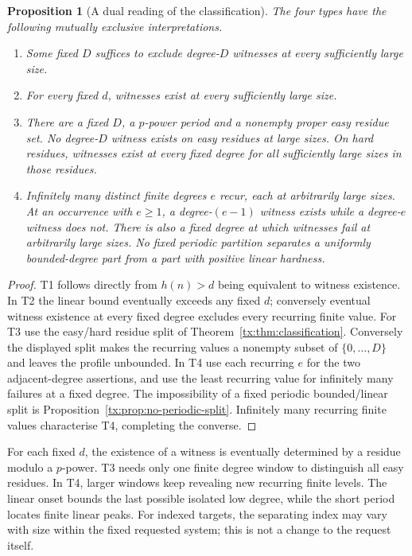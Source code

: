 \documentclass[11pt,a4paper,oneside,openany]{book}
\newtheorem{proposition}[theorem]{Proposition}
\theoremstyle{definition}\newtheorem{definition}[theorem]{Definition}
\theoremstyle{remark}\newtheorem{remark}[theorem]{Remark}
\numberwithin{equation}{chapter}
\begin{document}
\begin{proposition}[A dual reading of the classification]
\label{tx:prop:semantic-types}
The four types have the following mutually exclusive interpretations.
\begin{enumerate}[label=\textup{T\arabic*.}]
\item Some fixed $D$ suffices to exclude degree-$D$ witnesses at every
      sufficiently large size.
\item For every fixed $d$, witnesses exist at every sufficiently large
      size.
\item There are a fixed $D$, a $p$-power period and a nonempty proper
      easy residue set. No degree-$D$ witness exists on easy residues
      at large sizes. On hard residues, witnesses exist at every fixed
      degree for all sufficiently large sizes in those residues.
\item Infinitely many distinct finite degrees $e$ recur, each at
      arbitrarily large sizes. At an occurrence with $e\ge1$, a degree-$(e-1)$ witness
      exists while a degree-$e$ witness does not. There is also a fixed
      degree at which witnesses fail at arbitrarily large sizes. No
      fixed periodic partition separates a uniformly bounded-degree
      part from a part with positive linear hardness.
\end{enumerate}
\end{proposition}
\begin{proof}
T1 follows directly from $h(n)>d$ being equivalent to witness
existence. In T2 the linear bound eventually exceeds any fixed $d$;
conversely eventual witness existence at every fixed degree excludes
every recurring finite value. For T3 use the easy/hard residue split
of Theorem~\ref{tx:thm:classification}. Conversely the displayed split
makes the recurring values a nonempty subset of $\{0,\ldots,D\}$
and leaves the profile unbounded. In T4 use each recurring $e$ for
the two adjacent-degree assertions, and use the least recurring value
for infinitely many failures at a fixed degree. The impossibility of
a fixed periodic bounded/linear split is
Proposition~\ref{tx:prop:no-periodic-split}. Infinitely many recurring
finite values characterise T4, completing the converse.
\end{proof}

For each fixed $d$, the existence of a witness is eventually determined
by a residue modulo a $p$-power. T3 needs only one finite degree window
to distinguish all easy residues. In T4, larger windows keep revealing
new recurring finite levels. The linear onset bounds the last possible
isolated low degree, while the short period locates finite linear peaks.
For indexed targets, the separating index may vary with size within
the fixed requested system; this is not a change to the request itself.
\end{document}
